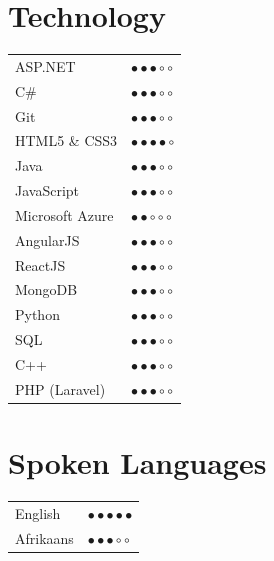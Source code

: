 \documentclass[10pt,a4paper,ragged2e,withhyper]{altacv}
\newcommand{\SkillBull}[1]{\textcolor{ColorTwo}{#1}}
\begin{document}
\begin{adjustbox}{valign=t}
\begin{minipage}{0.3\textwidth}
        \section*{Technology}
            \begin{tabular}{ll}
            	ASP.NET 		& \SkillBull{$\bullet \bullet \bullet \circ \circ$} \\
            	C\#              & \SkillBull{$\bullet \bullet \bullet \circ \circ$} \\
            	Git 			& \SkillBull{$\bullet \bullet \bullet \circ \circ$} \\
            	HTML5 \& CSS3 		& \SkillBull{$\bullet \bullet \bullet \bullet \circ$} \\
        	    Java     	    & \SkillBull{$\bullet \bullet \bullet \circ \circ$} \\
        	    JavaScript      & \SkillBull{$\bullet \bullet \bullet \circ \circ$} \\
            	Microsoft Azure & \SkillBull{$\bullet \bullet \circ \circ \circ$} \\ 
            	AngularJS       & \SkillBull{$\bullet \bullet \bullet \circ \circ$} \\
    		    ReactJS         & \SkillBull{$\bullet \bullet \bullet \circ \circ$} \\
    		    MongoDB         & \SkillBull{$\bullet \bullet \bullet \circ \circ$} \\
            	Python          & \SkillBull{$\bullet \bullet \bullet \circ \circ$} \\ 
            	SQL             & \SkillBull{$\bullet \bullet \bullet \circ \circ$} \\
    		    C++         & \SkillBull{$\bullet \bullet \bullet \circ \circ$} \\
                PHP (Laravel)         & \SkillBull{$\bullet \bullet \bullet \circ \circ$} \\
            \end{tabular}
        \section*{Spoken Languages}
            \begin{tabular}{ll}
            	English		& \SkillBull{$\bullet \bullet \bullet \bullet \bullet$}\\
            	Afrikaans   & \SkillBull{$\bullet \bullet \bullet \circ \circ$}\\
            \end{tabular}


        
            \vfill
    \end{minipage} 
    \end{adjustbox}
\end{document}
